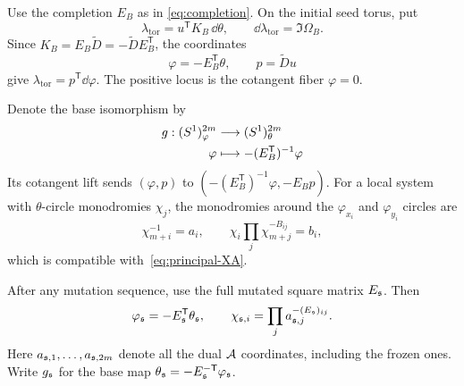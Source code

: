 \documentclass[12pt, letter]{amsart}
\theoremstyle{definition}
\numberwithin{equation}{section}
\begin{document}
Use the completion $E_B$ as in \eqref{eq:completion}. On the initial seed torus, put
\[
 \lambda_{\mathrm{tor}}=u^{\mathsf T}K_B\,\dd\theta,
 \qquad \dd\lambda_{\mathrm{tor}}=\Im\Omega_B.
\]
Since $K_B=E_B\widetilde D=-\widetilde D E_B^{\mathsf T}$, the coordinates
\begin{equation}\label{eq:marking}
 \varphi=-E_B^{\mathsf T}\theta,\qquad p=\widetilde D u
\end{equation}
give $\lambda_{\mathrm{tor}}=p^{\mathsf T}\dd\varphi$.
The positive locus is the cotangent fiber $\varphi=0$.



Denote the base isomorphism by
\begin{align*}
 g:(S^1)^{2m}_{\varphi} &\longrightarrow(S^1)^{2m}_{\theta}\\
 \varphi & \longmapsto -(E_B^\mathsf T)^{-1} \varphi
\end{align*}
Its cotangent lift sends $(\varphi,p)$ to
$(-(E_B^{\mathsf T})^{-1}\varphi,-E_Bp)$.
For a local system with $\theta$-circle monodromies $\chi_j$, the
monodromies around the $\varphi_{x_i}$ and $\varphi_{y_i}$ circles are
\[
 \chi_{m+i}^{-1}=a_i,\qquad
 \chi_i\prod_j\chi_{m+j}^{-B_{ij}}=b_i,
\]
which is compatible with~\eqref{eq:principal-XA}.

After any mutation sequence, use the full mutated square matrix $E_{\mathfrak{s}}$.
Then
\[
 \varphi_{\mathfrak{s}}=-E_{\mathfrak{s}}^{\mathsf T}\theta_{\mathfrak{s}},\qquad
 \chi_{\mathfrak{s},i}=\prod_j a_{\mathfrak{s},j}^{-(E_{\mathfrak{s}})_{ij}}.
\]
Here $a_{\mathfrak{s},1},\ldots,a_{\mathfrak{s},2m}$ denote all the dual $\mathcal{A}$ coordinates,
including the frozen ones.
Write $g_{\mathfrak{s}}$ for the base map
$\theta_{\mathfrak{s}}=-E_{\mathfrak{s}}^{-\mathsf T}\varphi_{\mathfrak{s}}$.
\end{document}
